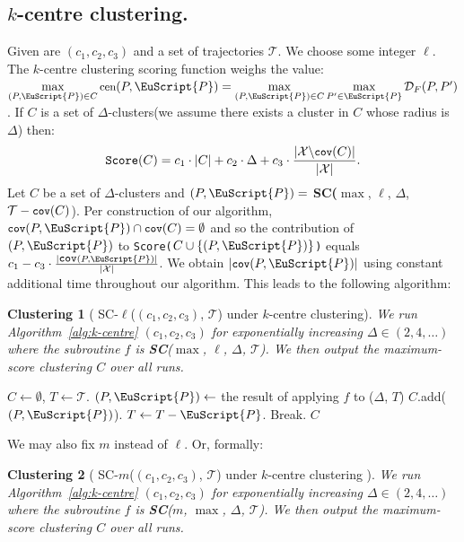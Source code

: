 \documentclass[11pt]{article}
\newcommand{\fancy}[1]{\EuScript{#1}}
\newcommand{\Cov}{\texttt{\small cov}}
\newcommand{\fd}{\mathcal{D}_F}
\newcommand{\centercost}{{\textnormal{\small cen}}}
\newcommand{\pathlet}{cluster\xspace}
\newcommand{\pathlets}{clusters\xspace}
\newtheorem{algodef}{Clustering}
\begin{document}
\subsection{\texorpdfstring{$k$-centre clustering.}{k-centre clustering}}
%
Given are $(c_1, c_2, c_3)$ and a set of trajectories $\mathcal{T}$. 
We choose some integer $\ell$. 
The $k$-centre clustering scoring function weighs the value:  $\max\limits_{(P, {\fancy{P}}) \in C} \centercost(P, {\fancy{P}}) = \max\limits_{(P, {\fancy{P}}) \in C} \max\limits_{P' \in {\fancy{P}}} \fd(P, P')$.
\vspace{0.5cm}
%
\noindent
If $C$ is a set of $\Delta$-\pathlets (we assume there exists a \pathlet in $C$ whose radius is $\Delta$) then:
\[
\texttt{Score}(C) =  c_1 \cdot |C| + c_2 \cdot \Delta + c_3 \cdot \frac{|\mathcal{X} \backslash \Cov(C) |}{|\mathcal{X}|}. 
\]
%
%
\noindent
Let $C$ be a set of $\Delta$-\pathlets and $(P, {\fancy{P}})=$ \textbf{SC(}$\max$, $\ell$, $\Delta$, $\mathcal{T} - \Cov(C)$).
Per construction of our algorithm, $\Cov(P, {\fancy{P}}) \cap \Cov(C) = \emptyset$ and so the contribution of  $(P, {\fancy{P}})$ to \texttt{Score($C \cup \{ (P, {\fancy{P}})\}$)} equals $c_1 - c_3 \cdot \frac{|\Cov(P, {\fancy{P}})|}{|\mathcal{X}|}$.
We obtain $|\Cov(P, {\fancy{P}})|$ using constant additional time throughout our algorithm.
This leads to the following algorithm:
%
\begin{algodef}[ SC-$\ell$($(c_1, c_2, c_3)$, $\mathcal{T}$) under $k$-centre clustering]
\label{algodef:k-centre-length}
    We run Algorithm~\ref{alg:k-centre} $(c_1, c_2, c_3)$ for exponentially increasing $\Delta \in (2, 4, \ldots )$  where the subroutine $f$ is \textbf{SC}($\max$, $\ell$, $\Delta$, $\mathcal{T}$). We then output the maximum-score clustering $C$ over all runs.
\end{algodef}
%
%
%
%
%
%
%
%
 \begin{algorithm}[h]
    \caption{\texttt{k\_centre}(\texttt{vector} $(c_1, c_2, c_3)$, \texttt{value} $\Delta$, \texttt{trajectory} $\mathcal{T}$, \texttt{subroutine} $f$) }
    \label{alg:k-centre}
    \begin{algorithmic}
    \State $C \gets \emptyset$, $T \gets \mathcal{T}$.
    \State $(P, {\fancy{P}}) \gets $ the result of applying $f$ to ($\Delta$, $T$)
    \If{ \texttt{Score}($C \cup \{ (P, {\fancy{P}}) \}$) $>$ \texttt{Score}($C$) }
    \State $C$.add($(P, {\fancy{P}})$).
    \State $T \gets T - {\fancy{P}}$.
    \Else
    \State Break.
    \EndIf
    \EndWhile
    \State \Return $C$
    \end{algorithmic}
  \end{algorithm}
%
%
\noindent
We may also fix $m$ instead of $\ell$. Or, formally:
%
\begin{algodef}[ SC-$m$($(c_1, c_2, c_3)$, $\mathcal{T}$) under $k$-centre clustering ]
\label{algodef:k-centre-size}
         We run Algorithm~\ref{alg:k-centre} $(c_1, c_2, c_3)$ for exponentially increasing $\Delta \in (2, 4, \ldots )$  where the subroutine $f$ is \textbf{SC}($m$, $\max$, $\Delta$, $\mathcal{T}$). We then output the maximum-score clustering $C$ over all runs.
\end{algodef}
%
%
%
\end{document}
